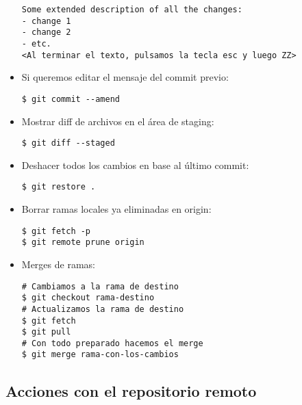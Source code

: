 \begin{itemize}[label=-]
\begin{lstlisting}
Some extended description of all the changes:
- change 1
- change 2
- etc.
<Al terminar el texto, pulsamos la tecla esc y luego ZZ>
\end{lstlisting}

\item Si queremos editar el mensaje del commit previo:
\begin{lstlisting}
$ git commit --amend
\end{lstlisting}

\item Mostrar diff de archivos en el área de staging:
\begin{lstlisting}
$ git diff --staged
\end{lstlisting}

\item Deshacer todos los cambios en base al último commit:
\begin{lstlisting}
$ git restore .
\end{lstlisting}

\item Borrar ramas locales ya eliminadas en origin:
\begin{lstlisting}
$ git fetch -p
$ git remote prune origin
\end{lstlisting}

\item Merges de ramas:
\begin{lstlisting}
# Cambiamos a la rama de destino
$ git checkout rama-destino
# Actualizamos la rama de destino
$ git fetch
$ git pull
# Con todo preparado hacemos el merge
$ git merge rama-con-los-cambios
\end{lstlisting}

\end{itemize}


\subsection{Acciones con el repositorio remoto}

